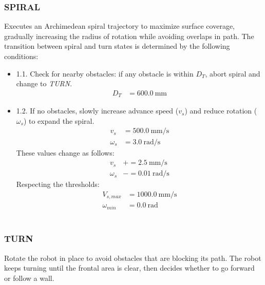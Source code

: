 \documentclass[conference]{IEEEtran}
\begin{document}
\subsubsection{SPIRAL} Executes an Archimedean spiral trajectory to maximize surface coverage, gradually increasing the radius of rotation while avoiding overlaps in path. The transition between spiral and turn states is determined by the following conditions:
\begin{itemize}
    \item 1.1. Check for nearby obstacles: if any obstacle is within $D_T$, abort spiral and change to \textit{TURN}.
    \begin{align}
        D_T &= 600.0 \ \text{mm} \label{eq:m_d_t}
    \end{align}
    \item 1.2. If no obstacles, slowly increase advance speed ($v_s$) and reduce rotation ($\omega_s$) to expand the spiral.
    \begin{align}
        v_s &= 500.0 \ \text{mm/s} \\
        \omega_s &= 3.0 \ \text{rad/s}
    \end{align}
    These values change as follows:
    \begin{align}
        v_s &\mathrel{+}= 2.5 \ \text{mm/s} \\
        \omega_s &\mathrel{-}= 0.01 \ \text{rad/s}
    \end{align}
    Respecting the thresholds:
    \begin{align}
        V_{s,max} &= 1000.0 \ \text{mm/s} \\
        \omega_{min} &= 0.0 \ \text{rad}
    \end{align} 
\end{itemize}

\subsubsection{TURN} Rotate the robot in place to avoid obstacles that are blocking its path. The robot keeps turning until the frontal area is clear, then decides whether to go forward or follow a wall.
\end{document}
